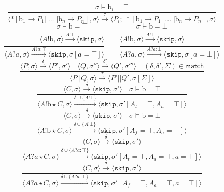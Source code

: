\documentclass[times, 10pt]{article}
\begin{document}
$$    \frac{\sigma \models \mathrm{b}_i = \top} {\langle *[ \mathrm{b}_1 \rightarrow P_1  | \; \ldots \; | \mathrm{b}_n \rightarrow P_n ] , \sigma \rangle \xrightarrow{\tau} \langle P_i;\;*[ \mathrm{b}_1 \rightarrow P_1  | \; \ldots \; | \mathrm{b}_n \rightarrow P_n ] , \sigma\rangle  } $$$$
    \frac{\sigma \models \mathrm{b} = \top}{\langle A!\mathrm{b}, \sigma \rangle \xrightarrow{A!\top} \langle \mathtt{skip}, \sigma \rangle} \qquad
    \frac{\sigma \models \mathrm{b} = \bot}{\langle A!\mathrm{b}, \sigma \rangle \xrightarrow{A!\bot} \langle \mathtt{skip}, \sigma \rangle} $$$$
    \frac{}{\langle A?a, \sigma \rangle \xrightarrow{A?a : \top} \langle \mathtt{skip}, \sigma[a = \top] \rangle} \qquad
    \frac{}{\langle A?a, \sigma \rangle \xrightarrow{A?a : \bot} \langle \mathtt{skip}, \sigma[a = \bot] \rangle} $$$$
    \frac{\langle P, \sigma \rangle \xrightarrow{\delta} \langle P', \sigma' \rangle \quad \langle Q, \sigma'' \rangle \xrightarrow{\delta'} \langle Q', \sigma''' \rangle \quad (\delta, \delta', \Sigma) \in \mathsf{match}}{\langle P || Q, \sigma \rangle \xrightarrow{\tau} \langle P' || Q', \sigma[\Sigma] \rangle} $$$$
    \frac{\langle C, \sigma \rangle \xrightarrow{\delta} \langle \mathtt{skip}, \sigma' \rangle \quad \sigma \models \mathrm{b} = \top}{\langle A!\mathrm{b} \star C, \sigma \rangle \xrightarrow{\delta \cup \{A!\top\}} \langle \mathtt{skip}, \sigma'[A_t = \top, A_a = \top] \rangle} $$$$
    \frac{\langle C, \sigma \rangle \xrightarrow{\delta} \langle \mathtt{skip}, \sigma' \rangle \quad \sigma \models \mathrm{b} = \bot}{\langle A!\mathrm{b} \star C, \sigma \rangle \xrightarrow{\delta \cup \{A!\bot\}} \langle \mathtt{skip}, \sigma'[A_f = \top, A_a = \top] \rangle} $$$$
    \frac{\langle C, \sigma \rangle \xrightarrow{\delta} \langle \mathtt{skip}, \sigma' \rangle}{\langle A?a \star C, \sigma \rangle \xrightarrow{\delta \cup \{A?a : \top\}} \langle \mathtt{skip}, \sigma'[A_t = \top, A_a = \top, a = \top] \rangle} $$$$
    \frac{\langle C, \sigma \rangle \xrightarrow{\delta} \langle \mathtt{skip}, \sigma' \rangle}{\langle A?a \star C, \sigma \rangle \xrightarrow{\delta \cup \{A?a : \bot\}} \langle \mathtt{skip}, \sigma'[A_f = \top, A_a = \top, a = \top] \rangle} $$$$
$$
\end{document}
